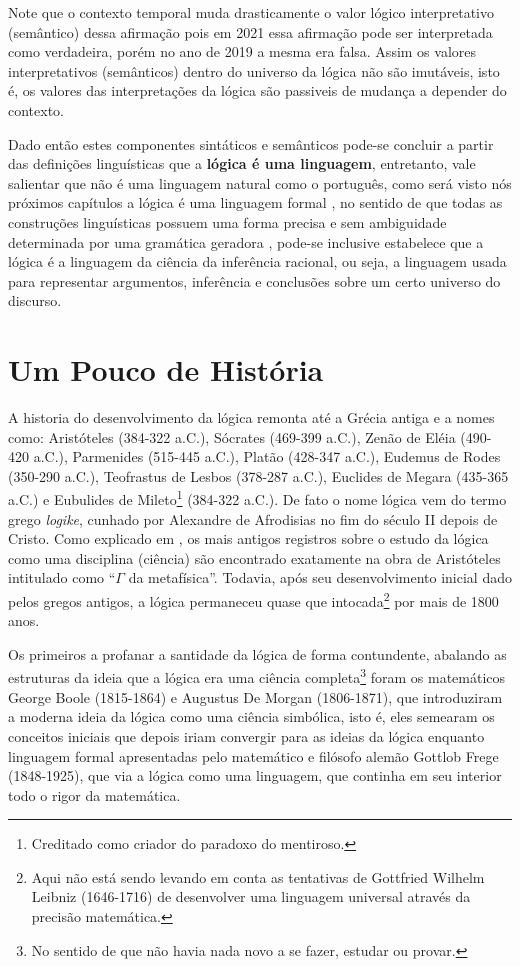 Note que o contexto temporal muda drasticamente o valor lógico interpretativo (semântico) dessa afirmação pois em 2021 essa afirmação pode ser interpretada como verdadeira, porém no ano de 2019 a mesma era falsa. Assim os valores interpretativos (semânticos) dentro do universo da lógica não são imutáveis, isto é, os valores das interpretações da lógica são passiveis de mudança a depender do contexto.

Dado então estes componentes sintáticos e semânticos pode-se concluir a partir das definições linguísticas que a \textbf{lógica é uma linguagem}, entretanto, vale salientar que não é uma linguagem natural como o português, como será visto nós próximos capítulos a lógica é uma linguagem formal \cite{benjaLivro2010}, no sentido de que todas as construções linguísticas possuem uma forma precisa e sem ambiguidade determinada por uma gramática geradora \cite{hopcroft2008, linz2006},  pode-se inclusive estabelece que a lógica é a linguagem da ciência da inferência racional, ou seja, a linguagem usada para representar argumentos, inferência e conclusões sobre um certo universo do discurso.

\section{Um Pouco de História}\label{sec:Um-pouco-historia}

A historia do desenvolvimento da lógica remonta até a Grécia antiga e a nomes como: Aristóteles (384-322 a.C.), Sócrates (469-399 a.C.), Zenão de Eléia (490-420 a.C.), Parmenides (515-445 a.C.), Platão (428-347 a.C.), Eudemus de Rodes (350-290 a.C.), Teofrastus de Lesbos (378-287 a.C.), Euclides de Megara (435-365 a.C.) e  Eubulides de Mileto\footnote{Creditado como criador do paradoxo do mentiroso.} (384-322 a.C.). De fato o nome lógica vem do termo grego \textit{logike}, cunhado por Alexandre de Afrodisias no fim do século II depois de Cristo. Como explicado em \cite{abe2002-logica}, os mais antigos registros sobre o estudo da lógica como uma disciplina (ciência) são encontrado exatamente na obra de Aristóteles intitulado como ``$\Gamma$ da metafísica''. Todavia, após seu desenvolvimento inicial dado pelos gregos antigos, a lógica permaneceu quase que intocada\footnote{Aqui não está sendo levando em conta as tentativas de Gottfried Wilhelm Leibniz (1646-1716) de desenvolver uma linguagem universal através da precisão matemática.} por mais de 1800 anos.

Os primeiros a profanar a santidade da lógica de forma contundente, abalando as estruturas da ideia que a lógica era uma ciência completa\footnote{No sentido de que não havia nada novo a se fazer, estudar ou provar.} foram os matemáticos George Boole (1815-1864) e Augustus De Morgan (1806-1871), que introduziram a moderna ideia da lógica como uma ciência simbólica, isto é, eles semearam os conceitos iniciais que depois iriam convergir para as ideias da lógica enquanto linguagem formal apresentadas pelo matemático e filósofo alemão Gottlob Frege (1848-1925), que via a lógica como uma linguagem, que continha em seu interior todo o rigor da matemática.

